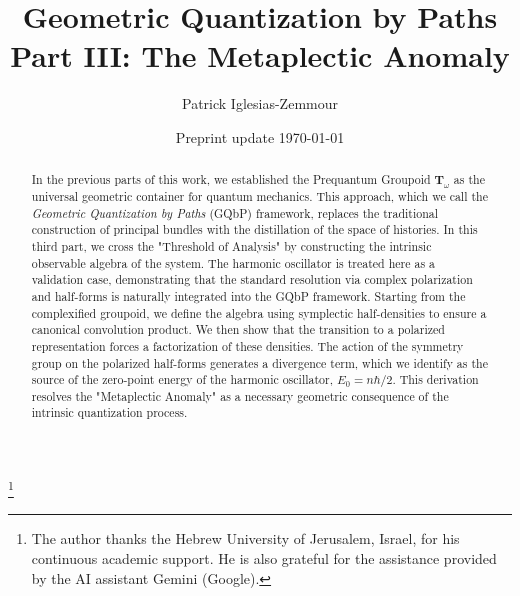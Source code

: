 \documentclass[11pt,reqno,letterpaper,twoside]{amsart}
\theoremstyle{articlestyle}
\theoremstyle{plain}
\theoremstyle{definition}
\newcommand{\TT}{\mathbf{T}}
\newcommand{\0}{\hat{0}}
\newcommand{\1}{\hat{1}}
\begin{document}
  
  
  \title[Geometric Quantization by Paths III]{Geometric Quantization by Paths \\ {\scriptsize Part III: The Metaplectic Anomaly}}
  
  \author{Patrick Iglesias-Zemmour}
  
  \address{Einstein Institute of Mathematics,
  The Hebrew University of Jerusalem,
  Campus Givat Ram,
  9190401 Israel.}
  
  \date{Preprint update \today}
  
  \thanks{The author thanks the Hebrew University of Jerusalem, Israel, for his continuous academic support.
  He is also grateful for the assistance provided by the AI assistant Gemini (Google).}
  
  
  
  \begin{abstract}
    In the previous parts of this work,
    we established the Prequantum Groupoid $\TT_\omega$ as the universal geometric container for quantum mechanics.
    This approach,
    which we call the \emph{Geometric Quantization by Paths} (GQbP) framework,
    replaces the traditional construction of principal bundles with the distillation of the space of histories.
    In this third part,
    we cross the "Threshold of Analysis" by constructing the intrinsic observable algebra of the system.
    The harmonic oscillator is treated here as a validation case,
    demonstrating that the standard resolution via complex polarization and half-forms 
    is naturally integrated into the GQbP framework.
    Starting from the complexified groupoid,
    we define the algebra using symplectic half-densities to ensure a canonical convolution product.
    We then show that the transition to a polarized representation forces a factorization of these densities.
    The action of the symmetry group on the polarized half-forms generates a divergence term,
    which we identify as the source of the zero-point energy of the harmonic oscillator,
    $E_0 = n\hbar/2$.
    This derivation resolves the "Metaplectic Anomaly" as a necessary geometric consequence of the intrinsic quantization process.
  \end{abstract}
  
\end{document}
